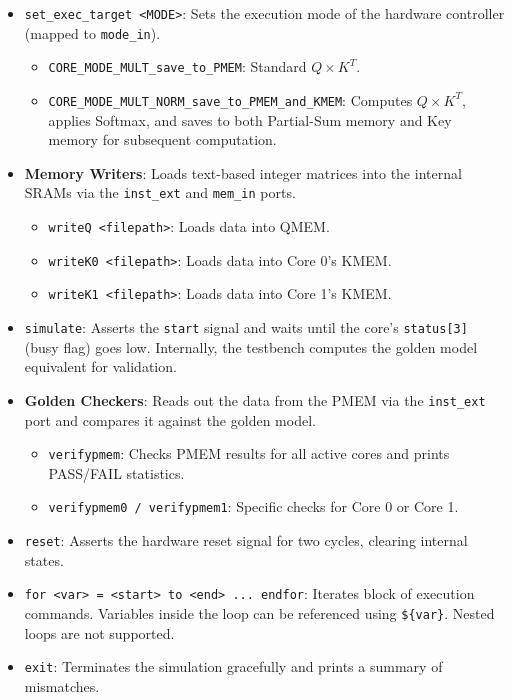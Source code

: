 \documentclass[journal]{IEEEtran}
\begin{document}
\begin{itemize}
    \item \texttt{set\_exec\_target <MODE>}: Sets the execution mode of the hardware controller (mapped to \texttt{mode\_in}).
    \begin{itemize}
        \item \texttt{CORE\_MODE\_MULT\_save\_to\_PMEM}: Standard $Q \times K^T$.
        \item \texttt{CORE\_MODE\_MULT\_NORM\_save\_to\_PMEM\_and\_KMEM}: Computes $Q \times K^T$, applies Softmax, and saves to both Partial-Sum memory and Key memory for subsequent computation.
    \end{itemize}
    \item \textbf{Memory Writers}: Loads text-based integer matrices into the internal SRAMs via the \texttt{inst\_ext} and \texttt{mem\_in} ports.
    \begin{itemize}
        \item \texttt{writeQ <filepath>}: Loads data into QMEM.
        \item \texttt{writeK0 <filepath>}: Loads data into Core 0's KMEM.
        \item \texttt{writeK1 <filepath>}: Loads data into Core 1's KMEM.
    \end{itemize}
    \item \texttt{simulate}: Asserts the \texttt{start} signal and waits until the core's \texttt{status[3]} (busy flag) goes low. Internally, the testbench computes the golden model equivalent for validation.
    \item \textbf{Golden Checkers}: Reads out the data from the PMEM via the \texttt{inst\_ext} port and compares it against the golden model.
    \begin{itemize}
        \item \texttt{verifypmem}: Checks PMEM results for all active cores and prints PASS/FAIL statistics.
        \item \texttt{verifypmem0 / verifypmem1}: Specific checks for Core 0 or Core 1.
    \end{itemize}
    \item \texttt{reset}: Asserts the hardware reset signal for two cycles, clearing internal states.
    \item \texttt{for <var> = <start> to <end> ... endfor}: Iterates block of execution commands. Variables inside the loop can be referenced using \texttt{\$\{var\}}. Nested loops are not supported.
    \item \texttt{exit}: Terminates the simulation gracefully and prints a summary of mismatches.
\end{itemize}
\clearpage
\end{document}
